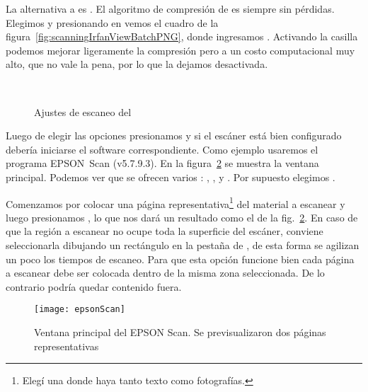 \documentclass[%
	a5paper,
	10pt,
	twoside,
	openright,
	final,
]{memoir}
\begin{document}
	La alternativa a \tiff es \png. El algoritmo de compresión de \png es siempre sin pérdidas. Elegimos  y presionando en   vemos el cuadro de la figura~\ref{fig:scanningIrfanViewBatchPNG}, donde ingresamos . Activando la casilla  podemos mejorar ligeramente la compresión pero a un costo computacional muy alto, que no vale la pena, por lo que la dejamos desactivada.

	\begin{figure}
		\centering
		\\
		\hfill
		\caption{Ajustes de escaneo del \irfanview\label{fig:scanningIrfanView}}
	\end{figure}

	Luego de elegir las opciones presionamos  y si el escáner está bien configurado debería iniciarse el software correspondiente. Como ejemplo usaremos el programa EPSON~Scan (v5.7.9.3). En la figura~\ref{fig:epsonScan} se muestra la ventana principal. Podemos ver que se ofrecen varios : , ,  y . Por supuesto elegimos .

	Comenzamos por colocar una página representativa\footnote{Elegí una donde haya tanto texto como fotografías.} del material a escanear y luego presionamos , lo que nos dará un resultado como el de la fig.~\ref{fig:epsonScan}. En caso de que la región a escanear no ocupe toda la superficie del escáner, conviene seleccionarla dibujando un rectángulo en la pestaña de , de esta forma se agilizan un poco los tiempos de escaneo. \label{pag:scanningRegionSelection} Para que esta opción funcione bien cada página a escanear debe ser colocada dentro de la misma zona seleccionada. De lo contrario podría quedar contenido fuera.

	\begin{figure}
		\texttt{[image: epsonScan]}
		\caption[Ventana principal del EPSON Scan]{Ventana principal del EPSON Scan. Se previsualizaron dos páginas representativas\label{fig:epsonScan}}
	\end{figure}
\end{document}
